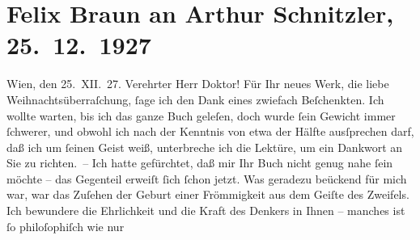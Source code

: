 

         \renewcommand{\erwaehnteOrte}{Orte: Sieveringer Straße, Wien}
         \renewcommand{\erwaehnteWerke}{Werke: Buch der Sprüche und Bedenken, Zum Abschied}
               \section[Felix Braun an Arthur Schnitzler, 25. 12. 1927]{ Felix Braun an Arthur Schnitzler, 25. 12. 1927}\nopagebreak{}\rehead{ }\begin{ledgroupsized}[t]{13cm}\normalsize\beginnumbering \toendnotes[C]{\smallbreak\pagebreak[2]} 
\toendnotes[C]{\smallbreak}\pstart
           \centering{}{\pb}Wien, den 25. XII. 27.\pend
           \pstart{}Verehrter Herr Doktor!\pend\pstart
           Für Ihr neues Werk, die liebe
               Weihnachtsüberraſchung, ſage ich den Dank eines zwiefach Beſchenkten. Ich wollte
               warten, bis ich das ganze Buch geleſen, doch wurde ſein Gewicht immer ſchwerer, und
               obwohl ich nach der Kenntnis von etwa der Hälfte ausſprechen darf, daß ich um ſeinen
               Geist weiß, unterbreche ich die Lektüre, um ein Dankwort an Sie zu richten. – \pend
           \pstart
           Ich hatte gefürchtet, daß mir Ihr Buch nicht genug \introOben{}nahe\introOben{} ſein
               möchte – das Gegenteil erweiſt ſich ſchon jetzt. Was geradezu beückend für {\pb}mich war, war das
               Zuſehen der Geburt einer Frömmigkeit aus dem Geiſte des Zweifels. Ich bewundere die
               Ehrlichkeit und die Kraft des Denkers in Ihnen – manches ist ſo philoſophiſch wie nur

\end{ledgroupsized}
